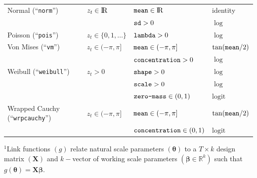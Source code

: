 \documentclass[12pt]{article}\usepackage[]{graphicx}\usepackage[]{color}
\begin{document}
\begin{table}
\begin{tabular}{llll}
  Normal (``\verb|norm|'')             & $z_t\in{\rm I\!R}$       & $\verb|mean|\in{\rm I\!R}$       &  identity \tabularnewline  
                                       &                          & $\verb|sd|>0$                    &  $\log$ \tabularnewline 
  Poisson (``\verb|pois|'')            & $z_t\in\{0,1,\ldots\}$   & $\verb|lambda|>0$                &  $\log$ \tabularnewline  
  Von Mises (``\verb|vm|'')            & $z_t\in(-\pi,\pi]$       & $\verb|mean|\in(-\pi,\pi]$       &  $\tan(\verb|mean|/2)$ \tabularnewline  
                                       &                          & $\verb|concentration|>0$         &  $\log$ \tabularnewline 
  Weibull (``\verb|weibull|'')         & $z_t>0$                  & $\verb|shape|>0$                 &  $\log$ \tabularnewline  
                                       &                          & $\verb|scale|>0$                 &  $\log$ \tabularnewline  
                                       &                          & $\verb|zero-mass|\in(0,1)$       &  $\text{logit}$ \tabularnewline 
  Wrapped Cauchy (``\verb|wrpcauchy|'')& $z_t\in(-\pi,\pi]$       & $\verb|mean|\in(-\pi,\pi]$       &  $\tan(\verb|mean|/2)$ \tabularnewline  
                                       &                          & $\verb|concentration|\in(0,1)$ &  $\text{logit}$ \tabularnewline 
  \bottomrule
  \end{tabular}
  \footnotesize{$^1$Link functions $(g)$ relate natural scale parameters $({\boldsymbol \theta})$ to a $T \times k$ design matrix $({\mathbf X})$ and $k-$vector of working scale parameters $(\boldsymbol{\beta}\in \mathbb{R}^k)$ such that $g({\boldsymbol \theta})={\mathbf X}\boldsymbol{\beta}$.}
\end{table}
\end{document}

